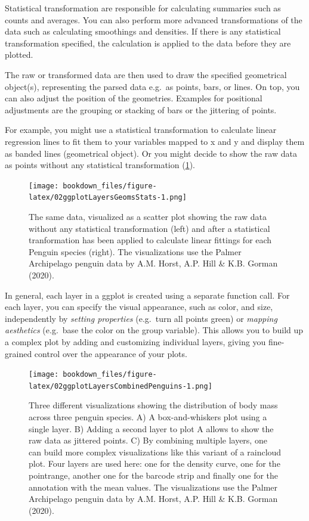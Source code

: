 \documentclass[
]{krantz}
\begin{document}
Statistical transformation are responsible for calculating summaries such as counts and averages. You can also perform more advanced transformations of the data such as calculating smoothings and densities. If there is any statistical transformation specified, the calculation is applied to the data before they are plotted.

The raw or transformed data are then used to draw the specified geometrical object(s), representing the parsed data e.g.~as points, bars, or lines. On top, you can also adjust the position of the geometries. Examples for positional adjustments are the grouping or stacking of bars or the jittering of points.

For example, you might use a statistical transformation to calculate linear regression lines to fit them to your variables mapped to x and y and display them as banded lines (geometrical object). Or you might decide to show the raw data as points without any statistical transformation (\ref{fig:02ggplotLayersGeomsStats}).

\begin{figure}
\centering
\texttt{[image: bookdown\_files/figure-latex/02ggplotLayersGeomsStats-1.png]}
\caption{\label{fig:02ggplotLayersGeomsStats}The same data, visualized as a scatter plot showing the raw data without any statistical transformation (left) and after a statistical tranformation has been applied to calculate linear fittings for each Penguin species (right). The visualizations use the Palmer Archipelago penguin data by A.M. Horst, A.P. Hill \& K.B. Gorman (2020).}
\end{figure}

In general, each layer in a ggplot is created using a separate function call. For each layer, you can specify the visual appearance, such as color, and size, independently by \emph{setting properties} (e.g.~turn all points green) or \emph{mapping aesthetics} (e.g.~base the color on the group variable). This allows you to build up a complex plot by adding and customizing individual layers, giving you fine-grained control over the appearance of your plots.

\begin{figure}
\centering
\texttt{[image: bookdown\_files/figure-latex/02ggplotLayersCombinedPenguins-1.png]}
\caption{\label{fig:02ggplotLayersCombinedPenguins}Three different visualizations showing the distribution of body mass across three penguin species. A) A box-and-whiskers plot using a single layer. B) Adding a second layer to plot A allows to show the raw data as jittered points. C) By combining multiple layers, one can build more complex visualizations like this variant of a raincloud plot. Four layers are used here: one for the density curve, one for the pointrange, another one for the barcode strip and finally one for the annotation with the mean values. The visualizations use the Palmer Archipelago penguin data by A.M. Horst, A.P. Hill \& K.B. Gorman (2020).}
\end{figure}
\end{document}
